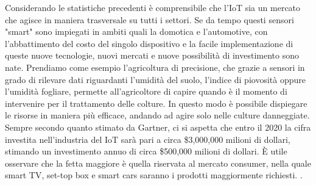 Considerando le statistiche precedenti è comprensibile che l'IoT sia un
mercato che agisce in maniera trasversale su tutti i settori. Se da tempo questi
sensori "smart" sono impiegati in ambiti quali la domotica e l'automotive,
con l'abbattimento del costo del
singolo  dispositivo e la facile implementazione di queste nuove tecnologie,  nuovi
mercati e nuove possibilità di investimento sono nate. Prendiamo come esempio
l'agricoltura di precisione, che grazie a sensori in grado di rilevare dati
riguardanti l'umidità del suolo, l'indice di piovosità oppure l'umidità fogliare,
permette all'agricoltore di  capire quando è il momento di intervenire per il
trattamento delle colture. In questo modo è possibile dispiegare le risorse in
maniera più efficace, andando ad agire solo nelle culture danneggiate.
Sempre secondo quanto stimato da Gartner, ci si aspetta che entro il 2020 
la cifra investita nell'industria del IoT
sarà pari a circa \$3,000,000 milioni di dollari, stimando un investimento annuo di
circa \$500,000 milioni di dollari. È utile osservare che la fetta maggiore è quella
riservata al mercato consumer, nella quale smart TV, set-top box e smart cars
saranno i prodotti
maggiormente richiesti.
\cite{gartner2016}. 



